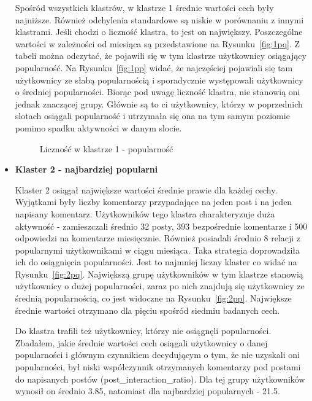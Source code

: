\documentclass[polish,12pt]{aghthesis}
\begin{document}
\begin{itemize}
Spośród wszystkich klastrów, w klastrze 1 średnie wartości cech były najniższe. Również odchylenia standardowe są niskie w porównaniu z innymi klastrami. Jeśli chodzi o liczność klastra, to jest on największy. Poszczególne wartości w zależności od miesiąca są przedstawione na Rysunku~\ref{fig:1pq}. Z tabeli można odczytać, że pojawili się w tym klastrze użytkownicy osiągający popularność. Na Rysunku~\ref{fig:1pp} widać, że najczęściej pojawiali się tam użytkownicy ze słabą popularnością i sporadycznie występowali użytkownicy o średniej popularności. Biorąc pod uwagę liczność klastra, nie stanowią oni jednak znaczącej grupy. Głównie są to ci użytkownicy, którzy w poprzednich slotach osiągali popularność i utrzymała się ona na tym samym poziomie pomimo spadku aktywności w danym slocie.


   \begin{figure}[ht] 
    \centering
    \hfill%
    \caption{Liczność w klastrze 1 - popularność}
    \label{f:1p}
    \end{figure}




\item \textbf{Klaster 2 - najbardziej popularni}

Klaster 2 osiągał największe wartości średnie prawie dla każdej cechy. Wyjątkami były liczby komentarzy przypadające na jeden post i na jeden napisany komentarz. Użytkowników tego klastra charakteryzuje duża aktywność - zamieszczali średnio 32 posty, 393 bezpośrednie komentarze i 500 odpowiedzi na komentarze miesięcznie. Również posiadali średnio 8 relacji z popularnymi użytkownikami w ciągu miesiąca. Taka strategia doprowadziła ich do osiągnięcia popularności. Jest to najmniej liczny klaster co widać na Rysunku~\ref{fig:2pq}. Największą grupę użytkowników w tym klastrze stanowią użytkownicy o dużej popularności, zaraz po nich znajdują się użytkownicy ze średnią popularnością, co jest widoczne na Rysunku~\ref{fig:2pp}. Największe średnie wartości otrzymano dla pięciu spośród siedmiu badanych cech. 


Do klastra trafili też użytkownicy, którzy nie osiągnęli popularności. Zbadałem, jakie średnie wartości cech osiągali użytkownicy o danej popularności i głównym czynnikiem decydującym o tym, że nie uzyskali oni popularności, był niski współczynnik otrzymanych komentarzy pod postami do napisanych postów (post\_interaction\_ratio). Dla tej grupy użytkowników wynosił on średnio 3.85, natomiast dla najbardziej popularnych - 21.5.
    


\end{itemize}
\end{document}
